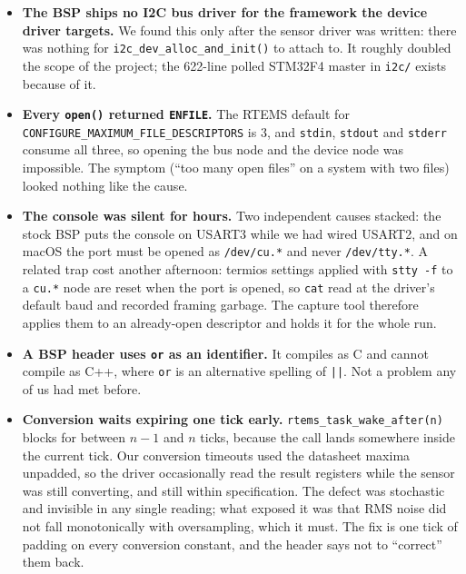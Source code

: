 \documentclass[10pt,a4]{article}
\begin{document}
\begin{itemize}
\item \textbf{The BSP ships no I2C bus driver for the framework the device
  driver targets.} We found this only after the sensor driver was written: there
  was nothing for \texttt{i2c\_dev\_alloc\_and\_init()} to attach to. It roughly
  doubled the scope of the project; the 622-line polled STM32F4 master in
  \texttt{i2c/} exists because of it.

\item \textbf{Every \texttt{open()} returned \texttt{ENFILE}.} The RTEMS default
  for \texttt{CONFIGURE\_MAXIMUM\_FILE\_DESCRIPTORS} is 3, and
  \texttt{stdin}, \texttt{stdout} and \texttt{stderr} consume all three, so
  opening the bus node and the device node was impossible. The symptom (``too
  many open files'' on a system with two files) looked nothing like the cause.

\item \textbf{The console was silent for hours.} Two independent causes stacked:
  the stock BSP puts the console on USART3 while we had wired USART2, and on
  macOS the port must be opened as \texttt{/dev/cu.*} and never
  \texttt{/dev/tty.*}. A related trap cost another afternoon: termios settings
  applied with \texttt{stty -f} to a \texttt{cu.*} node are reset when the port
  is opened, so \texttt{cat} read at the driver's default baud and recorded
  framing garbage. The capture tool therefore applies them to an already-open
  descriptor and holds it for the whole run.

\item \textbf{A BSP header uses \texttt{or} as an identifier.} It compiles as C
  and cannot compile as C++, where \texttt{or} is an alternative spelling of
  \texttt{||}. Not a problem any of us had met before.

\item \textbf{Conversion waits expiring one tick early.}
  \texttt{rtems\_task\_wake\_after(n)} blocks for between $n-1$ and $n$ ticks,
  because the call lands somewhere inside the current tick. Our conversion
  timeouts used the datasheet maxima unpadded, so the driver occasionally read
  the result registers while the sensor was still converting, and still within
  specification. The defect was stochastic and invisible in any single reading;
  what exposed it was that RMS noise did not fall monotonically with
  oversampling, which it must. The fix is one tick of padding on every
  conversion constant, and the header says not to ``correct'' them back.


\end{itemize}
\end{document}
